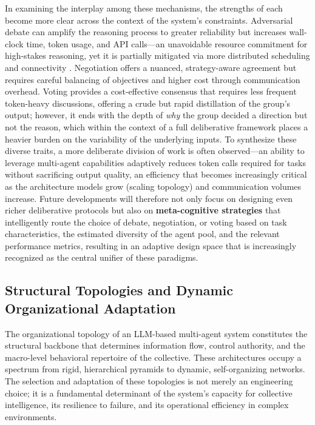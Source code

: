 \documentclass[11pt,a4paper]{article}
\begin{document}
In examining the interplay among these mechanisms, the strengths of each become more clear across the context of the system's constraints. Adversarial debate can amplify the reasoning process to greater reliability but increases wall-clock time, token usage, and API calls---an unavoidable resource commitment for high-stakes reasoning, yet it is partially mitigated via more distributed scheduling and connectivity \cite{arxiv:2402.15538v1}. Negotiation offers a nuanced, strategy-aware agreement but requires careful balancing of objectives and higher cost through communication overhead. Voting provides a cost-effective consensus that requires less frequent token-heavy discussions, offering a crude but rapid distillation of the group's output; however, it ends with the depth of \emph{why} the group decided a direction but not the reason, which within the context of a full deliberative framework places a heavier burden on the variability of the underlying inputs. To synthesize these diverse traits, a more deliberate division of work is often observed---an ability to leverage multi-agent capabilities adaptively reduces token calls required for tasks without sacrificing output quality, an efficiency that becomes increasingly critical as the architecture models grow (scaling topology) and communication volumes increase. Future developments will therefore not only focus on designing even richer deliberative protocols but also on \textbf{meta-cognitive strategies} that intelligently route the choice of debate, negotiation, or voting based on task characteristics, the estimated diversity of the agent pool, and the relevant performance metrics, resulting in an adaptive design space that is increasingly recognized as the central unifier of these paradigms.


\subsection{Structural Topologies and Dynamic Organizational Adaptation}


The organizational topology of an LLM-based multi-agent system constitutes the structural backbone that determines information flow, control authority, and the macro-level behavioral repertoire of the collective. These architectures occupy a spectrum from rigid, hierarchical pyramids to dynamic, self-organizing networks. The selection and adaptation of these topologies is not merely an engineering choice; it is a fundamental determinant of the system's capacity for collective intelligence, its resilience to failure, and its operational efficiency in complex environments.
\end{document}
